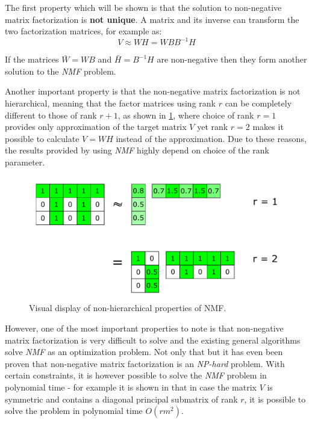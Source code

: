 \documentclass[thesis=M,english]{FITthesis}[2012/10/20]
\begin{document}
The first property which will be shown is that the solution to non-negative matrix
factorization is \textbf{not unique}. A matrix and its inverse can transform the two
factorization matrices, for example as:
\begin{equation}
  V \approx WH = WBB^{-1}H
\end{equation}

If the matrices $\bar{W} = WB$ and $\bar{H} = B^{-1}H$ are non-negative then they
form another solution to the \emph{NMF} problem.\cite{nmf-nonuniq}

Another important property is that the non-negative matrix factorization is not
hierarchical, meaning that the factor matrices using rank $r$ can be completely
different to those of rank $r+1$, as shown in \ref{fig:nmf-hierarchy}, where choice of
rank $r = 1$ provides only approximation of the target matrix $V$ yet rank $r = 2$ makes it
possible to calculate $V = WH$ instead of the approximation. Due to these
reasons, the results provided by using \emph{NMF} highly depend on choice of the rank
parameter.

\begin{figure}[h]
  \centering
  \caption{Visual display of non-hierarchical properties of NMF. \cite{nonhierarchy}}
  \label{fig:nmf-hierarchy}
  \includegraphics[scale=0.7]{imgs/non-hierarchical}
\end{figure}

However, one of the most important properties to note is that non-negative matrix
factorization is very difficult to solve and the existing general algorithms
solve \emph{NMF} as an optimization problem. Not only that but it has even been
proven that non-negative matrix factorization is an \emph{NP-hard} problem.\cite{nmf-nphard}
With certain constraints, it is however possible to solve the \emph{NMF} problem
in polynomial time - for example it is shown in \cite{nmf-poly} that in case the
matrix $V$ is symmetric and contains a diagonal principal submatrix of rank $r$,
it is possible to solve the problem in polynomial time $O(rm^{2})$.
\end{document}

